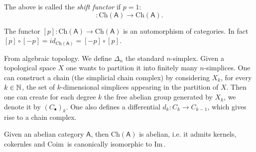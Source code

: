 \begin{rem}
	The above is called the {\em shift functor} if $p = 1$:
	\begin{equation}
		[1]\colon \mathrm{Ch}(\mathsf{A}) \to \mathrm{Ch}(\mathsf{A}).
	\end{equation} 
\end{rem}

\begin{rem}[]
	The functor $[p]\colon \mathrm{Ch}(\mathsf{A}) \to \mathrm{Ch}(\mathsf{A})$ is an automorphism of categories.
	In fact $[p] \circ [-p] = id_{\mathrm{Ch}(\mathsf{A})} = [-p] \circ [p]$.	
\end{rem}

\begin{rem}
	From algebraic topology.
	We define $\Delta_n$ the standard $n$-simplex.
	Given a topological space $X$ one wants to partition it into finitely many
	$n$-simplices.
	One can construct a chain (the simplicial chain complex) by considering $X_k$, for every $k \in \mathbb{N}$,
	the set of $k$-dimensional simplices appearing in the partition of $X$.
	Then one can create for each degree $k$ the free abelian group generated by $X_k$, we denote it by $(C_{\bullet})_k$.
	One also defines a differential $d_k\colon C_k \to C_{k-1}$, which gives rise to a chain complex.
\end{rem}

\begin{prop}
	Given an abelian category $\mathsf{A}$, then $\mathrm{Ch}(\mathsf{A})$ is abelian,
	i.e. it admits kernels, cokernles and $\mathrm{Coim}\, $ is canonically isomorphic to $\mathrm{Im}\, $.
\end{prop}

